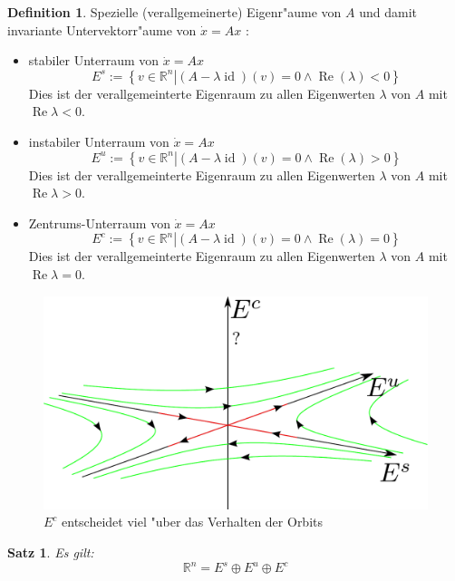 \documentclass[a4paper, 13pt]{scrreprt}
\newtheorem{satz}{Satz}[section]
\theoremstyle{definition} \newtheorem{definition}{Definition}[section]
\newcommand{\RR}{\mathbb{R}}
\begin{document}
\begin{definition}
	Spezielle (verallgemeinerte) Eigenr"aume von \(A\) und damit invariante Untervektorr"aume von \(\dot{x}=Ax\) : 
	\begin{itemize} 
		\item stabiler Unterraum von \(\dot{x}=Ax\)
			$$E^s := \left\{\left. v\in \RR^n \right| (A-\lambda \operatorname{id})(v) = 0 \land \operatorname{Re}(\lambda) < 0\right\}$$ 
			Dies ist der verallgemeinterte Eigenraum zu allen Eigenwerten $\lambda$ von $A$ mit $\operatorname{Re}\lambda < 0$.
		\item instabiler Unterraum von \(\dot{x}=Ax\)
		$$E^u := \left\{\left. v\in \RR^n \right| (A-\lambda \operatorname{id})(v) = 0 \land \operatorname{Re}(\lambda) > 0\right\}$$ 
			Dies ist der verallgemeinterte Eigenraum zu allen Eigenwerten $\lambda$ von $A$ mit $\operatorname{Re}\lambda > 0$.
		\item Zentrums-Unterraum von \(\dot{x}=Ax\)
		$$E^c := \left\{\left. v\in \RR^n \right| (A-\lambda \operatorname{id})(v) = 0 \land \operatorname{Re}(\lambda) = 0\right\}$$ 
			Dies ist der verallgemeinterte Eigenraum zu allen Eigenwerten $\lambda$ von $A$ mit $\operatorname{Re}\lambda = 0$.
	\end{itemize}
\end{definition}
\begin{figure}[htpb]
		\centering
		\includegraphics[height=0.30\textheight]{img/eigenraeume.pdf}
		\caption{$E^c$ entscheidet viel "uber das Verhalten der Orbits}
\end{figure}

\begin{satz}
Es gilt: 
	\[\RR^n = E^s \oplus E^u \oplus E^c \]
\end{satz}
\end{document}
